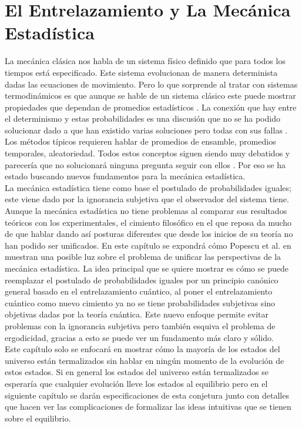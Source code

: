 \chapter{El Entrelazamiento y La Mecánica Estadística} \label{cap:2}



La mecánica clásica nos habla de un sistema físico definido que para todos los tiempos está especificado. Este sistema evolucionan de manera determinista dadas las ecuaciones de movimiento. Pero lo que sorprende al tratar con  sistemas termodinámicos es que aunque se hable de un sistema clásico este puede mostrar propiedades que dependan de promedios estadísticos \cite{CallenThermo}. La conexión que hay entre el determinismo y estas probabilidades es una discusión que no se ha podido solucionar dado a que han existido varias soluciones pero todas con sus fallas . Los métodos típicos requieren hablar de promedios de ensamble, promedios temporales, aleatoriedad. Todos estos conceptos siguen siendo muy debatidos y parecería que no solucionará ninguna pregunta seguir con ellos \cite{TodaStat}. Por eso se ha estado buscando nuevos fundamentos para la mecánica estadística.
\\
La mecánica estadística tiene como base el postulado de probabilidades iguales; este viene dado por la ignorancia subjetiva que el observador del sistema tiene. Aunque la mecánica estadística no tiene problemas al comparar sus resultados teóricos con los experimentales, el cimiento filosófico en el que reposa da mucho de que hablar dando así posturas diferentes que desde los inicios de su teoría no han podido ser unificados. En este capítulo se expondrá cómo Popescu et al. en \cite{Popescu2006} muestran una posible luz sobre el problema de unificar las perspectivas de la mecánica estadística. La idea principal que se quiere mostrar es cómo se puede reemplazar el postulado de probabilidades iguales por un principio canónico general basado en el entrelazamiento cuántico, al poner el entrelazamiento cuántico como nuevo cimiento ya no se tiene probabilidades subjetivas sino objetivas dadas por la teoría  cuántica. Este nuevo enfoque permite evitar problemas con la ignorancia subjetiva pero también esquiva el problema de ergodicidad, gracias a esto se puede ver un fundamento más claro y sólido. 
\\
Este capítulo solo se enfocará en mostrar cómo la mayoría de los estados del universo están termalizados sin hablar en ningún momento de la evolución de estos estados. Si en general los estados del universo están termalizados se esperaría que cualquier evolución lleve los estados al equilibrio pero en el siguiente capítulo se darán especificaciones de esta conjetura junto con detalles que hacen ver las complicaciones de formalizar las ideas intuitivas que se tienen sobre el equilibrio.
\\

